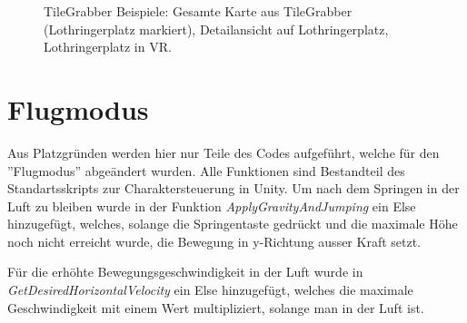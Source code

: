 \renewcommand{\baselinestretch}{1}\normalsize

\renewcommand{\baselinestretch}{1.5}\normalsize
\begin{figure}[htp]%
	\centering
	\hspace{8pt}%
	
	\hspace{48pt}%
	\hspace{8pt}%

	\caption[TileGrabber Beispiele.]
	{TileGrabber Beispiele:
		 Gesamte Karte aus TileGrabber (Lothringerplatz markiert),
		 Detailansicht auf Lothringerplatz,
		 Lothringerplatz in VR.}%
\end{figure}


\newpage
\section{Flugmodus}\label{s.flug}
Aus Platzgründen werden hier nur Teile des Codes aufgeführt, welche für den ''Flugmodus'' abgeändert wurden. Alle Funktionen sind Bestandteil des Standartsskripts zur Charaktersteuerung in Unity. 
Um nach dem Springen in der Luft zu bleiben wurde in der Funktion \textit{ApplyGravityAndJumping} ein Else hinzugefügt, welches, solange die Springentaste gedrückt und die maximale Höhe noch nicht erreicht wurde, die Bewegung in y-Richtung ausser Kraft setzt. 

\renewcommand{\baselinestretch}{1}\normalsize

\renewcommand{\baselinestretch}{1.5}\normalsize

\newpage
Für die erhöhte Bewegungsgeschwindigkeit in der Luft wurde in \textit{GetDesiredHorizontalVelocity} ein Else hinzugefügt, welches die maximale Geschwindigkeit mit einem Wert multipliziert, solange man in der Luft ist.

\renewcommand{\baselinestretch}{1}\normalsize

\renewcommand{\baselinestretch}{1.5}\normalsize





